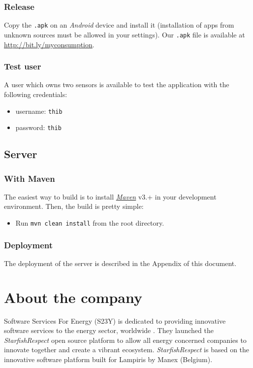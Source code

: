 \documentclass[a4paper, oneside, 11pt]{book}
\begin{document}
\subsubsection{Release}
Copy the \texttt{.apk} on an \textit{Android} device and install it (installation of apps from unknown sources must be allowed in your settings). Our \texttt{.apk} file is available at \url{http://bit.ly/myconsumption}.

\subsubsection{Test user}
A user which owns two sensors is available to test the application with the following credentials:
\begin{itemize}
	\item username: \texttt{thib}
	\item password: \texttt{thib}
\end{itemize}

\subsection{Server}
\subsubsection{With Maven}
The easiest way to build is to install \href{http://maven.apache.org/download.html}{\textit{Maven}} v3.+ in your development environment. 
Then, the build is pretty simple:
\begin{itemize}
	\item Run \texttt{mvn clean install} from the root directory. 
\end{itemize}

\subsubsection{Deployment}
The deployment of the server is described in the Appendix of this document.

\section{About the company}
Software Services For Energy (S23Y) is dedicated to providing innovative software services to the energy sector, worldwide \cite{S23Y:online}. They launched the \textit{StarfishRespect} open source platform to allow all energy concerned companies to innovate together and create a vibrant ecosystem. \textit{StarfishRespect} is based on the innovative software platform built for Lampiris by Manex (Belgium). 
\end{document}
